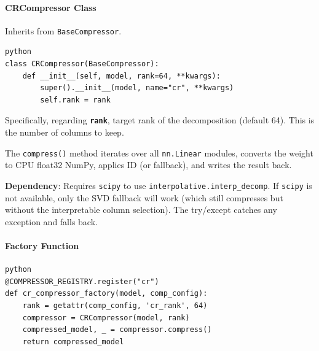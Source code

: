 \paragraph{CRCompressor Class}

Inherits from \texttt{BaseCompressor}.

\vspace{0.5em}
\begin{mdframed}[backgroundcolor=codebg, linecolor=codeframe, linewidth=1pt, roundcorner=4pt, innerleftmargin=2pt, innerrightmargin=5pt, innertopmargin=5pt, innerbottommargin=5pt]
\begin{lstlisting}
python
class CRCompressor(BaseCompressor):
    def __init__(self, model, rank=64, **kwargs):
        super().__init__(model, name="cr", **kwargs)
        self.rank = rank
\end{lstlisting}
\end{mdframed}
\vspace{0.5em}

Specifically, regarding \textbf{\texttt{rank}}, target rank of the decomposition (default 64). This is the number of columns to keep.


The \texttt{compress()} method iterates over all \texttt{nn.Linear} modules, converts the weight to CPU float32 NumPy, applies ID (or fallback), and writes the result back.

\textbf{Dependency}: Requires \texttt{scipy} to use \texttt{interpolative.interp\_decomp}. If \texttt{scipy} is not available, only the SVD fallback will work (which still compresses but without the interpretable column selection). The try/except catches any exception and falls back.

\paragraph{Factory Function}

\vspace{0.5em}
\begin{mdframed}[backgroundcolor=codebg, linecolor=codeframe, linewidth=1pt, roundcorner=4pt, innerleftmargin=2pt, innerrightmargin=5pt, innertopmargin=5pt, innerbottommargin=5pt]
\begin{lstlisting}
python
@COMPRESSOR_REGISTRY.register("cr")
def cr_compressor_factory(model, comp_config):
    rank = getattr(comp_config, 'cr_rank', 64)
    compressor = CRCompressor(model, rank)
    compressed_model, _ = compressor.compress()
    return compressed_model
\end{lstlisting}
\end{mdframed}
\vspace{0.5em}

